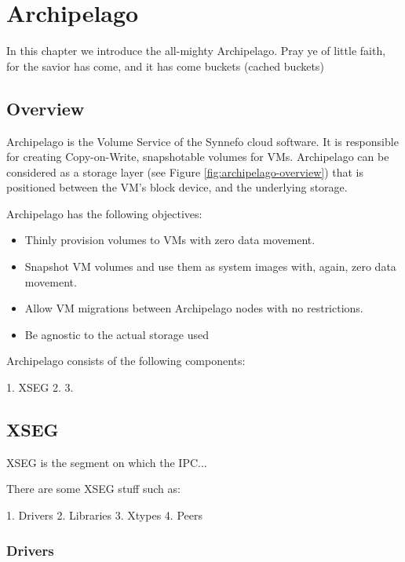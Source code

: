 \chapter{Archipelago}\label{ch:theory}

In this chapter we introduce the all-mighty Archipelago. Pray ye of little 
faith, for the savior has come, and it has come buckets (cached buckets)

\section{Overview}

Archipelago is the Volume Service of the Synnefo cloud software. It is 
responsible for creating Copy-on-Write, snapshotable volumes for VMs.  
Archipelago can be considered as a storage layer (see Figure 
\ref{fig:archipelago-overview}) that is positioned between the VM's block 
device, and the underlying storage.


Archipelago has the following objectives:

\begin{itemize}
	\item Thinly provision volumes to VMs with zero data movement.
	\item Snapshot VM volumes and use them as system images with, again, zero 
		data movement.
	\item Allow VM migrations between Archipelago nodes with no restrictions.
	\item Be agnostic to the actual storage used
\end{itemize}
	

Archipelago consists of the following components:

1. XSEG
2.
3.

\section{XSEG}

XSEG is the segment on which the IPC...

There are some XSEG stuff such as:

1. Drivers
2. Libraries
3. Xtypes
4. Peers

\subsection{Drivers}

